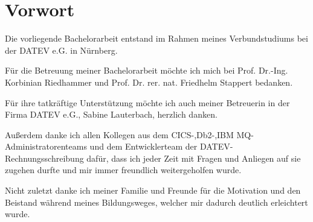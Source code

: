 \newpage
\section*{Vorwort}
Die vorliegende Bachelorarbeit entstand im Rahmen meines Verbundstudiums bei der DATEV e.G. in Nürnberg.

Für die Betreuung meiner Bachelorarbeit möchte ich mich bei Prof. Dr.-Ing. Korbinian Riedhammer und Prof. Dr. rer. nat. Friedhelm Stappert bedanken.

Für ihre tatkräftige Unterstützung möchte ich auch meiner Betreuerin in der Firma DATEV e.G., Sabine Lauterbach,  herzlich danken.

Außerdem danke ich allen Kollegen aus dem CICS-,Db2-,IBM MQ-Administratorenteams und dem Entwicklerteam der DATEV-Rechnungsschreibung dafür, dass ich jeder Zeit mit Fragen und Anliegen auf sie zugehen durfte und mir immer freundlich weitergeholfen wurde.

Nicht zuletzt danke ich meiner Familie und Freunde für die Motivation und den Beistand während meines Bildungsweges, welcher mir dadurch deutlich erleichtert wurde.

